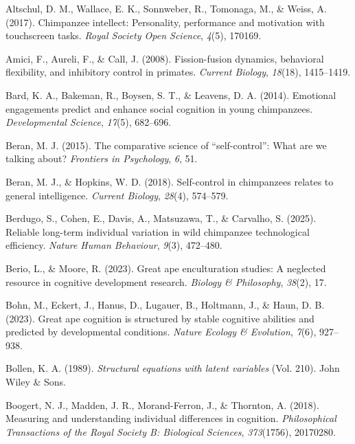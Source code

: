 \documentclass[
  man,floatsintext]{apa6}
\newlength{\cslhangindent}
\newenvironment{CSLReferences}[2] %
 {\begin{list}{}{%
  \setlength{\itemindent}{0pt}
  \setlength{\leftmargin}{0pt}
  \setlength{\parsep}{0pt}
  \ifodd #1
   \setlength{\leftmargin}{\cslhangindent}
   \setlength{\itemindent}{-1\cslhangindent}
  \fi
  \setlength{\itemsep}{#2\baselineskip}}}
 {\end{list}}
\begin{document}
\label{refs}
\begin{CSLReferences}{1}{0}
Altschul, D. M., Wallace, E. K., Sonnweber, R., Tomonaga, M., \& Weiss, A. (2017). Chimpanzee intellect: Personality, performance and motivation with touchscreen tasks. \emph{Royal Society Open Science}, \emph{4}(5), 170169.

Amici, F., Aureli, F., \& Call, J. (2008). Fission-fusion dynamics, behavioral flexibility, and inhibitory control in primates. \emph{Current Biology}, \emph{18}(18), 1415--1419.

Bard, K. A., Bakeman, R., Boysen, S. T., \& Leavens, D. A. (2014). Emotional engagements predict and enhance social cognition in young chimpanzees. \emph{Developmental Science}, \emph{17}(5), 682--696.

Beran, M. J. (2015). The comparative science of {``self-control''}: What are we talking about? \emph{Frontiers in Psychology}, \emph{6}, 51.

Beran, M. J., \& Hopkins, W. D. (2018). Self-control in chimpanzees relates to general intelligence. \emph{Current Biology}, \emph{28}(4), 574--579.

Berdugo, S., Cohen, E., Davis, A., Matsuzawa, T., \& Carvalho, S. (2025). Reliable long-term individual variation in wild chimpanzee technological efficiency. \emph{Nature Human Behaviour}, \emph{9}(3), 472--480.

Berio, L., \& Moore, R. (2023). Great ape enculturation studies: A neglected resource in cognitive development research. \emph{Biology \& Philosophy}, \emph{38}(2), 17.

Bohn, M., Eckert, J., Hanus, D., Lugauer, B., Holtmann, J., \& Haun, D. B. (2023). Great ape cognition is structured by stable cognitive abilities and predicted by developmental conditions. \emph{Nature Ecology \& Evolution}, \emph{7}(6), 927--938.

Bollen, K. A. (1989). \emph{Structural equations with latent variables} (Vol. 210). John Wiley \& Sons.

Boogert, N. J., Madden, J. R., Morand-Ferron, J., \& Thornton, A. (2018). Measuring and understanding individual differences in cognition. \emph{Philosophical Transactions of the Royal Society B: Biological Sciences}, \emph{373}(1756), 20170280.


\end{CSLReferences}
\end{document}
